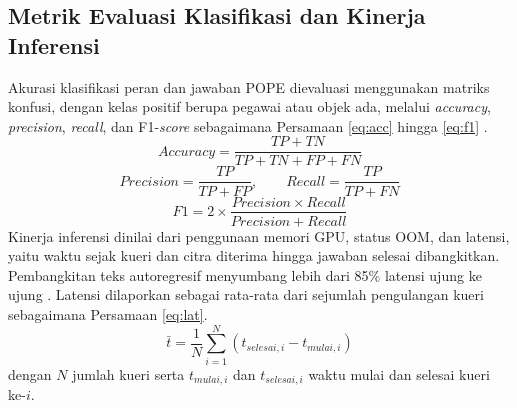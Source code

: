 \subsection{Metrik Evaluasi Klasifikasi dan Kinerja Inferensi}
Akurasi klasifikasi peran dan jawaban POPE dievaluasi menggunakan matriks konfusi, dengan kelas positif berupa pegawai atau objek ada, melalui \textit{accuracy}, \textit{precision}, \textit{recall}, dan F1-\textit{score} sebagaimana Persamaan \eqref{eq:acc} hingga \eqref{eq:f1} \cite{ref2}.
\begin{equation}
Accuracy = \frac{TP + TN}{TP + TN + FP + FN}
\label{eq:acc}
\end{equation}
\begin{equation}
Precision = \frac{TP}{TP + FP}, \qquad Recall = \frac{TP}{TP + FN}
\label{eq:pr}
\end{equation}
\begin{equation}
F1 = 2 \times \frac{Precision \times Recall}{Precision + Recall}
\label{eq:f1}
\end{equation}
Kinerja inferensi dinilai dari penggunaan memori GPU, status OOM, dan latensi, yaitu waktu sejak kueri dan citra diterima hingga jawaban selesai dibangkitkan. Pembangkitan teks autoregresif menyumbang lebih dari 85\% latensi ujung ke ujung \cite{ref24}. Latensi dilaporkan sebagai rata-rata dari sejumlah pengulangan kueri sebagaimana Persamaan \eqref{eq:lat}.
\begin{equation}
\bar{t} = \frac{1}{N} \sum_{i=1}^{N} \left(t_{selesai,i} - t_{mulai,i}\right)
\label{eq:lat}
\end{equation}
dengan $N$ jumlah kueri serta $t_{mulai,i}$ dan $t_{selesai,i}$ waktu mulai dan selesai kueri ke-$i$.
